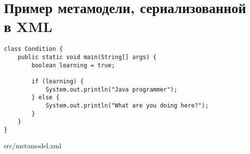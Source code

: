 \chapter{Пример метамодели, сериализованной в XML}
\label{sec:metamodel_xml}

\begin{lstlisting}[caption={Исходная программа}]
class Condition {
    public static void main(String[] args) {
        boolean learning = true;

        if (learning) {
            System.out.println("Java programmer");
        } else {
            System.out.println("What are you doing here?");
        }
    }
}

\end{lstlisting}


{src/metamodel.xml}
